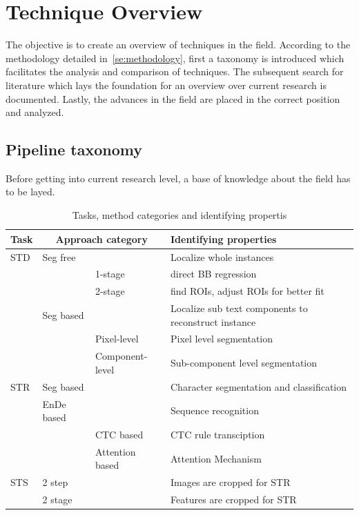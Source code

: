 \chapter{Technique Overview}\label{ch:research}
The objective is to create an overview of techniques in the field.
According to the methodology detailed in~\ref{se:methodology}, first a taxonomy is introduced
which facilitates the analysis and comparison of techniques.
The subsequent search for literature which lays the foundation for an overview over current research
is documented.
Lastly, the advances in the field are placed in the correct position and analyzed.

\section{Pipeline taxonomy}\label{se:taxonomy}
Before getting into current research level, a base of knowledge about the field has to be layed.
\begin{table}[h]
    \centering\scriptsize
    \begin{tabular}{p{}p{}p{}p{}}
        Task & \multicolumn{2}{c}{Approach category} & Identifying properties \\
        \toprule
        STD & Seg free & & Localize whole instances  \\
            & & 1-stage & direct BB regression \\
            & & 2-stage & find ROIs, adjust ROIs for better fit \\
            & Seg based & & Localize sub text components to reconstruct instance \\
            & & Pixel-level & Pixel level segmentation \\
            & & Component-level & Sub-component level segmentation \\
        \midrule
        STR & Seg based & & Character segmentation and classification\\
            & \ac{EnDe} based & & Sequence recognition \\
            & & CTC based & CTC rule transciption \\
            & & Attention based & Attention Mechanism \\
        \midrule
        STS & 2 step & & Images are cropped for STR \\
            & 2 stage & & Features are cropped for STR \\
        \bottomrule
    \end{tabular}
    \caption{Tasks, method categories and identifying propertis\label{tb:steps-properties}}
\end{table}
